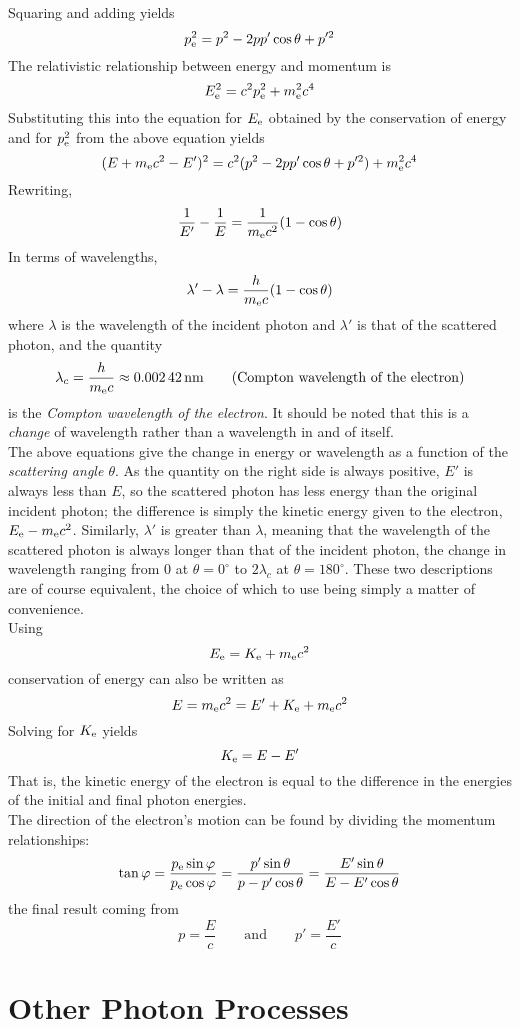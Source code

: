 \documentclass{subfiles}
\begin{document}
				Squaring and adding yields
				\[p_{\text{e}}^2 = p^2 - 2pp'\cos\theta + p'^2\]
				The relativistic relationship between energy and momentum is
				\[E_{\text{e}}^2 = c^2p_{\text{e}}^2 + m_{\text{e}}^2c^4\]
				Substituting this into the equation for \(E_{\text{e}}\) obtained by the conservation of energy and for \(p_{\text{e}}^2\) from the above equation yields
				\[(E + m_{\text{e}}c^2 - E')^2 = c^2(p^2 - 2pp'\cos\theta + p'^2) + m_{\text{e}}^2c^4\]
				Rewriting,
				\[\frac{1}{E'} - \frac{1}{E} = \frac{1}{m_{\text{e}}c^2}(1 - \cos\theta)\]
				In terms of wavelengths,
				\[\lambda' - \lambda = \frac{h}{m_{\text{e}}c}(1 - \cos\theta)\]
				where \(\lambda\) is the wavelength of the incident photon and \(\lambda'\) is that of the scattered photon, and the quantity
				\[
					\lambda_c = \frac{h}{m_{\text{e}}c}
						\approx \SI{0.00242}{nm}
						\tag{Compton wavelength of the electron}
				\]
				is the \textit{Compton wavelength of the electron}. It should be noted that this is a \textit{change} of wavelength rather than a wavelength in and of itself. \\
				The above equations give the change in energy or wavelength as a function of the \textit{scattering angle \(\theta\)}. As the quantity on the right side is always positive, \(E'\) is always less than \(E\), so the scattered photon has less energy than the original incident photon; the difference is simply the kinetic energy given to the electron, \(E_{\text{e}} - m_{\text{e}}c^2\). Similarly, \(\lambda'\) is greater than \(\lambda\), meaning that the wavelength of the scattered photon is always longer than that of the incident photon, the change in wavelength ranging from 0 at \(\theta = 0^\circ\) to \(2\lambda_c\) at \(\theta = 180^\circ\). These two descriptions are of course equivalent, the choice of which to use being simply a matter of convenience. \\
				Using
				\[E_{\text{e}} = K_{\text{e}} + m_{\text{e}}c^2\]
				conservation of energy can also be written as
				\[E = m_{\text{e}}c^2 = E' + K_{\text{e}} + m_{\text{e}}c^2\]
				Solving for \(K_{\text{e}}\) yields
				\[K_{\text{e}} = E - E'\]
				That is, the kinetic energy of the electron is equal to the difference in the energies of the initial and final photon energies. \\
				The direction of the electron's motion can be found by dividing the momentum relationships:
				\[
					\tan\varphi = \frac{p_{\text{e}}\sin\varphi}{p_{\text{e}}\cos\varphi}
						= \frac{p'\sin\theta}{p - p'\cos\theta}
						= \frac{E'\sin\theta}{E - E'\cos\theta}
				\]
				the final result coming from
				\[
					p = \frac{E}{c} \qquad \text{and} \qquad
						p' = \frac{E'}{c}
				\]
	\section{Other Photon Processes}
		
\end{document}

